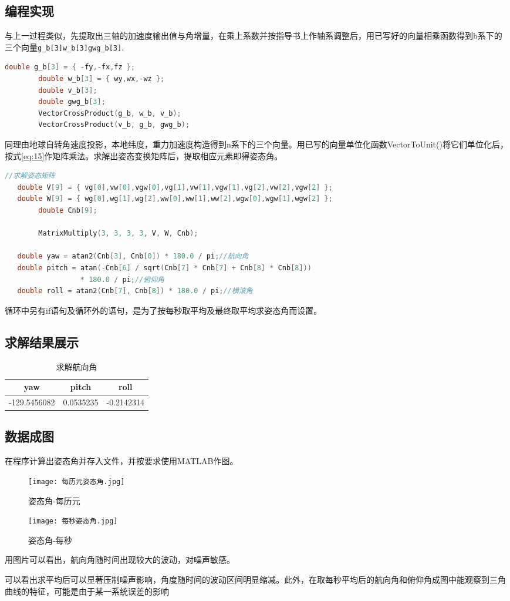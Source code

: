 \documentclass{ctexart}
\begin{document}
\subsection{编程实现}
与上一过程类似，先提取出三轴的加速度输出值与角增量，在乘上系数并按指导书上作轴系调整后，用已写好的向量相乘函数得到b系下的三个向量\verb|g_b[3]|\verb|w_b[3]|\verb|gwg_b[3]|.
\begin{lstlisting}[language=C]
                double g_b[3] = { -fy,-fx,fz }; 
		double w_b[3] = { wy,wx,-wz };
		double v_b[3];
		double gwg_b[3];
		VectorCrossProduct(g_b, w_b, v_b);
		VectorCrossProduct(v_b, g_b, gwg_b);
\end{lstlisting}
同理由地球自转角速度投影，本地纬度，重力加速度构造得到n系下的三个向量。用已写的向量单位化函数VectorToUnit()将它们单位化后，按式\eqref{eq:15}作矩阵乘法。求解出姿态变换矩阵后，提取相应元素即得姿态角。
\begin{lstlisting}[language=C]
              //求解姿态矩阵
   double V[9] = { vg[0],vw[0],vgw[0],vg[1],vw[1],vgw[1],vg[2],vw[2],vgw[2] };
   double W[9] = { wg[0],wg[1],wg[2],ww[0],ww[1],ww[2],wgw[0],wgw[1],wgw[2] };
		double Cnb[9];

		MatrixMultiply(3, 3, 3, 3, V, W, Cnb);

   double yaw = atan2(Cnb[3], Cnb[0]) * 180.0 / pi;//航向角
   double pitch = atan(-Cnb[6] / sqrt(Cnb[7] * Cnb[7] + Cnb[8] * Cnb[8]))
                  * 180.0 / pi;//俯仰角
   double roll = atan2(Cnb[7], Cnb[8]) * 180.0 / pi;//横滚角
\end{lstlisting}
循环中另有if语句及循环外的语句，是为了按每秒取平均及最终取平均求姿态角而设置。
\subsection{求解结果展示}
\begin{table}[H]
	\centering
	\begin{tabular}{ccc}
	\toprule[1.5pt]
	yaw&pitch&roll\\
	\midrule
	-129.5456082&0.0535235& -0.2142314\\
	\bottomrule[1.2pt]
	\end{tabular}
	\caption{求解航向角}
\end{table}

\subsection{数据成图}
在程序计算出姿态角并存入文件，并按要求使用MATLAB作图。
\begin{figure}[H]
\texttt{[image: 每历元姿态角.jpg]}
\caption{姿态角-每历元}
\end{figure}
\begin{figure}[H]
\texttt{[image: 每秒姿态角.jpg]}
\caption{姿态角-每秒}
\end{figure}
用图片可以看出，航向角随时间出现较大的波动，对噪声敏感。

可以看出求平均后可以显著压制噪声影响，角度随时间的波动区间明显缩减。此外，在取每秒平均后的航向角和俯仰角成图中能观察到三角曲线的特征，可能是由于某一系统误差的影响
\end{document}
